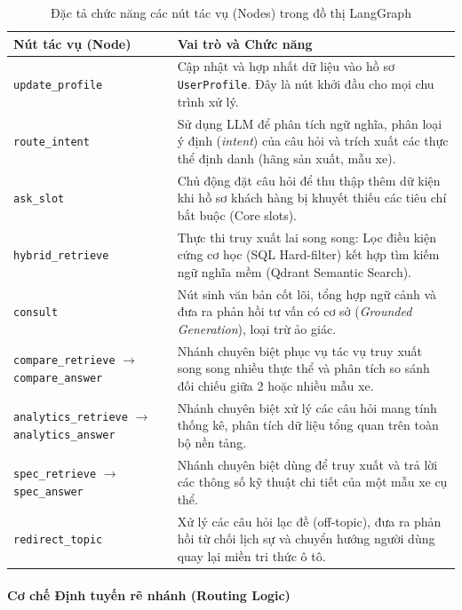 \begin{table}[H]
\centering
\caption{Đặc tả chức năng các nút tác vụ (Nodes) trong đồ thị LangGraph}
\label{tab:langgraph-nodes}
\renewcommand{\arraystretch}{1.3}
\begin{tabular}{|p{}|p{}|}
\hline
\textbf{Nút tác vụ (Node)} & \textbf{Vai trò và Chức năng} \\ \hline
\texttt{update\_profile} & Cập nhật và hợp nhất dữ liệu vào hồ sơ \texttt{UserProfile}. Đây là nút khởi đầu cho mọi chu trình xử lý. \\ \hline
\texttt{route\_intent} & Sử dụng LLM để phân tích ngữ nghĩa, phân loại ý định (\textit{intent}) của câu hỏi và trích xuất các thực thể định danh (hãng sản xuất, mẫu xe). \\ \hline
\texttt{ask\_slot} & Chủ động đặt câu hỏi để thu thập thêm dữ kiện khi hồ sơ khách hàng bị khuyết thiếu các tiêu chí bắt buộc (Core slots). \\ \hline
\texttt{hybrid\_retrieve} & Thực thi truy xuất lai song song: Lọc điều kiện cứng cơ học (SQL Hard-filter) kết hợp tìm kiếm ngữ nghĩa mềm (Qdrant Semantic Search). \\ \hline
\texttt{consult} & Nút sinh văn bản cốt lõi, tổng hợp ngữ cảnh và đưa ra phản hồi tư vấn có cơ sở (\textit{Grounded Generation}), loại trừ ảo giác. \\ \hline
\texttt{compare\_retrieve} $\rightarrow$ \texttt{compare\_answer} & Nhánh chuyên biệt phục vụ tác vụ truy xuất song song nhiều thực thể và phân tích so sánh đối chiếu giữa 2 hoặc nhiều mẫu xe. \\ \hline
\texttt{analytics\_retrieve} $\rightarrow$ \texttt{analytics\_answer} & Nhánh chuyên biệt xử lý các câu hỏi mang tính thống kê, phân tích dữ liệu tổng quan trên toàn bộ nền tảng. \\ \hline
\texttt{spec\_retrieve} $\rightarrow$ \texttt{spec\_answer} & Nhánh chuyên biệt dùng để truy xuất và trả lời các thông số kỹ thuật chi tiết của một mẫu xe cụ thể. \\ \hline
\texttt{redirect\_topic} & Xử lý các câu hỏi lạc đề (off-topic), đưa ra phản hồi từ chối lịch sự và chuyển hướng người dùng quay lại miền tri thức ô tô. \\ \hline
\end{tabular}
\end{table}

\paragraph{Cơ chế Định tuyến rẽ nhánh (Routing Logic)}

